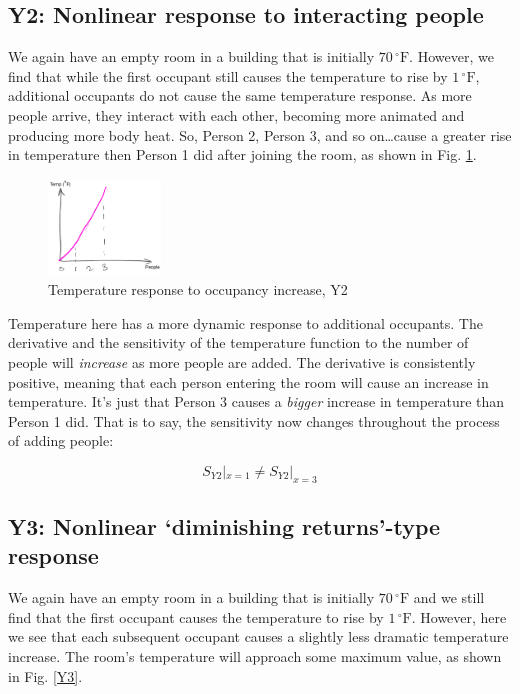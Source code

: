 \documentclass[10pt]{article}
\begin{document}
\subsection{Y2: Nonlinear response to interacting people}

We again have an empty room in a building that is initially $70\,^{\circ}\mathrm{F}$. However, we find that while the first occupant still causes the temperature to rise by $1\,^{\circ}\mathrm{F}$, additional occupants do not cause the same temperature response. As more people arrive, they interact with each other, becoming more animated and producing more body heat. So, Person 2, Person 3, and so on\ldots cause a greater rise in temperature then Person 1 did after joining the room, as shown in Fig. \ref{Y2}.

            \begin{figure}[h]
            \centering
            \includegraphics[width=3cm]{extras25/y2}
            \caption{Temperature response to occupancy increase, Y2}
            \label{Y2}
            \end{figure}

Temperature here has a more dynamic response to additional occupants. The derivative and the sensitivity of the temperature function to the number of people will \textit{increase} as more people are added. The derivative is consistently positive, meaning that each person entering the room will cause an increase in temperature. It's just that Person 3 causes a \textit{bigger} increase in temperature than Person 1 did. That is to say, the sensitivity now changes throughout the process of adding people:

$$ S_{Y2} |_{x=1} \neq S_{Y2}|_{x=3} $$

\subsection{Y3: Nonlinear `diminishing returns'-type response}

We again have an empty room in a building that is initially $70\,^{\circ}\mathrm{F}$ and we still find that the first occupant  causes the temperature to rise by $1\,^{\circ}\mathrm{F}$. However, here we see that each subsequent occupant causes a slightly less dramatic temperature increase. The room's temperature will approach some maximum value, as shown in Fig. \ref{Y3}.
\end{document}
